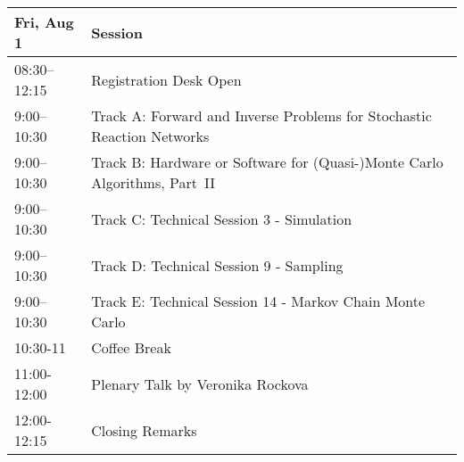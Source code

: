 \begin{table}
\begin{tabularx}{\textwidth}{>{\hsize=0.32\hsize}X|>{\hsize=1.7\hsize}X}
\hline
\textbf{Fri, Aug 1} & \textbf{Session} \\
\hline
\cellcolor{\EmptyColor}08:30–12:15 & \cellcolor{\EmptyColor}Registration Desk Open \\
\cellcolor{\SessionTitleColor}9:00–10:30 & \cellcolor{\SessionTitleColor}Track A: Forward and Inverse Problems for Stochastic Reaction Networks \\
\cellcolor{\SessionTitleColor}9:00–10:30 & \cellcolor{\SessionTitleColor}Track B: Hardware or Software for (Quasi-)Monte Carlo Algorithms, Part~II \\
\cellcolor{\SessionLightColor}9:00–10:30 & \cellcolor{\SessionLightColor}Track C: Technical Session 3 - Simulation \\
\cellcolor{\SessionLightColor}9:00–10:30 & \cellcolor{\SessionLightColor}Track D: Technical Session 9 - Sampling \\
\cellcolor{\SessionLightColor}9:00–10:30 & \cellcolor{\SessionLightColor}Track E: Technical Session 14 - Markov Chain Monte Carlo \\
\cellcolor{\EmptyColor}10:30-11 & \cellcolor{\EmptyColor}Coffee Break \\
\cellcolor{\PlenaryColor}11:00-12:00 & \cellcolor{\PlenaryColor}Plenary Talk by Veronika Rockova \\
\cellcolor{\EmptyColor}12:00-12:15 & \cellcolor{\EmptyColor}Closing Remarks \\
\hline
\end{tabularx}
\end{table}

